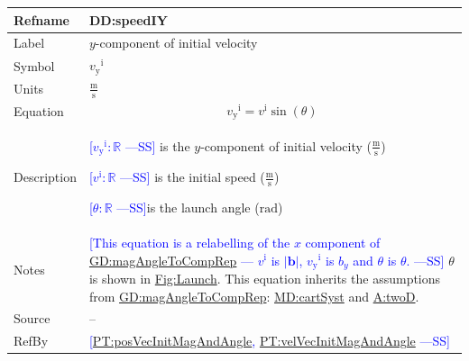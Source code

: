 \documentclass[12pt]{article}
\newcommand{\authornote}[3]{\textcolor{#1}{[#3 ---#2]}}
\newcommand{\authornote}[3]{}
\newcommand{\wss}[1]{\authornote{blue}{SS}{#1}}
\begin{document}
\medskip
\noindent
\begin{minipage}{\textwidth}
\begin{tabular}{>{\raggedright}p{}>{\raggedright\arraybackslash}p{}}
\toprule \textbf{Refname} & \textbf{DD:speedIY}
\label{DD:speedIY}
\\ \midrule
Label & $y$-component of initial velocity
        
\\ \midrule
Symbol & ${{v_{\text{y}}}^{\text{i}}}$
         
\\ \midrule
Units & $\frac{\text{m}}{\text{s}}$
        
\\ \midrule
Equation & \begin{displaymath}
           {{v_{\text{y}}}^{\text{i}}}={v^{\text{i}}} \sin\left(θ\right)
           \end{displaymath}
\\ \midrule
Description & \begin{symbDescription}
              \item{\wss{${{v_{\text{y}}}^{\text{i}}}: \mathbb{R}$} is the $y$-component of initial velocity ($\frac{\text{m}}{\text{s}}$)}
              \item{\wss{${v^{\text{i}}}: \mathbb{R}$} is the initial speed ($\frac{\text{m}}{\text{s}}$)}
              \item{\wss{$θ: \mathbb{R}$}is the launch angle (${\text{rad}}$)}
              \end{symbDescription}
\\ \midrule
Notes & \wss{This equation is a relabelling of the $x$ component of
\hyperref[GD:magAngleToCompRep]{GD:magAngleToCompRep} --- ${v^{\text{i}}}$ is
$|\symbf{b}|$, ${v_{\text{y}}}^{\text{i}}$ is $b_y$ and $\theta$ is $\theta$.}
$θ$ is shown in \hyperref[Figure:Launch]{Fig:Launch}.   This equation inherits
the assumptions from \hyperref[GD:magAngleToCompRep]{GD:magAngleToCompRep}:
\hyperref[MD:cartSyst]{MD:cartSyst} and \hyperref[twoD]{A:twoD}.
        
\\ \midrule
Source & --
         
\\ \midrule
RefBy & \wss{\hyperref[PT:posVecInitMagAndAngle]{PT:posVecInitMagAndAngle},
\hyperref[PT:velVecInitMagAndAngle]{PT:velVecInitMagAndAngle}}
        
\\ \bottomrule
\end{tabular}
\end{minipage}
~\\
\end{document}
